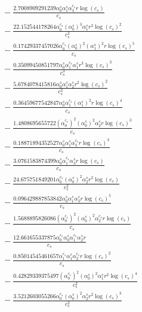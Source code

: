 \documentclass[10pt]{article}
\begin{document}
\begin{align*}
&{}  - \frac{2.7008909291239 \alpha_{0}^s \alpha_{1}^s \alpha_{3}^{c_s} r \log{\left(c_{s} \right)}}{c_{s}} \\
&{}  - \frac{22.152544178264 \alpha_{0}^{c_s} \left(\alpha_{0}^s\right)^{3} \alpha_{1}^s r^{2} \log{\left(c_{s} \right)}^{2}}{c_{s}^{2}} \\
&{}  - \frac{0.17429337457026 \alpha_{0}^{c_s} \left(\alpha_{0}^s\right)^{2} \left(\alpha_{1}^s\right)^{2} r \log{\left(c_{s} \right)}^{5}}{c_{s}} \\
&{}  - \frac{0.35099450851797 \alpha_{0}^s \alpha_{1}^{c_s} \alpha_{1}^s r^{3} \log{\left(c_{s} \right)}^{3}}{c_{s}^{3}} \\
&{}  - \frac{5.6784078415816 \alpha_{0}^s \alpha_{1}^s \alpha_{2}^s r^{2} \log{\left(c_{s} \right)}^{2}}{c_{s}^{2}} \\
&{}  - \frac{0.36459677542847 \alpha_{0}^s \alpha_{1}^{c_s} \left(\alpha_{1}^s\right)^{2} r \log{\left(c_{s} \right)}^{4}}{c_{s}} \\
&{}  - \frac{1.4808695655722 \left(\alpha_{0}^{c_s}\right)^{2} \left(\alpha_{0}^s\right)^{2} \alpha_{2}^s r \log{\left(c_{s} \right)}^{3}}{c_{s}} \\
&{}  - \frac{0.18871894352527 \alpha_{0}^s \alpha_{1}^s \alpha_{3}^{c_s} r \log{\left(c_{s} \right)}^{3}}{c_{s}} \\
&{}  - \frac{3.0761583874399 \alpha_{0}^s \alpha_{1}^{c_s} \alpha_{3}^s r \log{\left(c_{s} \right)}}{c_{s}} \\
&{}  - \frac{24.675751849201 \alpha_{0}^{c_s} \left(\alpha_{0}^s\right)^{2} \alpha_{2}^s r^{2} \log{\left(c_{s} \right)}}{c_{s}^{2}} \\
&{}  - \frac{0.096429887853842 \alpha_{0}^s \alpha_{1}^s \alpha_{3}^s r \log{\left(c_{s} \right)}^{5}}{c_{s}} \\
&{}  - \frac{1.5688895826086 \left(\alpha_{0}^{c_s}\right)^{2} \left(\alpha_{0}^s\right)^{2} \alpha_{2}^{c_s} r \log{\left(c_{s} \right)}}{c_{s}} \\
&{}  - \frac{12.661655337875 \alpha_{0}^{c_s} \alpha_{0}^s \alpha_{1}^{c_s} \alpha_{2}^s r}{c_{s}} \\
&{}  - \frac{0.85014545461657 \alpha_{1}^{c_s} \alpha_{1}^s \alpha_{2}^{c_s} r \log{\left(c_{s} \right)}^{2}}{c_{s}} \\
&{}  - \frac{0.42829339375497 \left(\alpha_{0}^{c_s}\right)^{2} \left(\alpha_{0}^s\right)^{2} \alpha_{1}^s r^{2} \log{\left(c_{s} \right)}^{4}}{c_{s}^{2}} \\
&{}  - \frac{3.5212603055266 \alpha_{0}^{c_s} \left(\alpha_{0}^s\right)^{2} \alpha_{2}^s r^{2} \log{\left(c_{s} \right)}^{3}}{c_{s}^{2}} \\

\end{align*}
\end{document}
